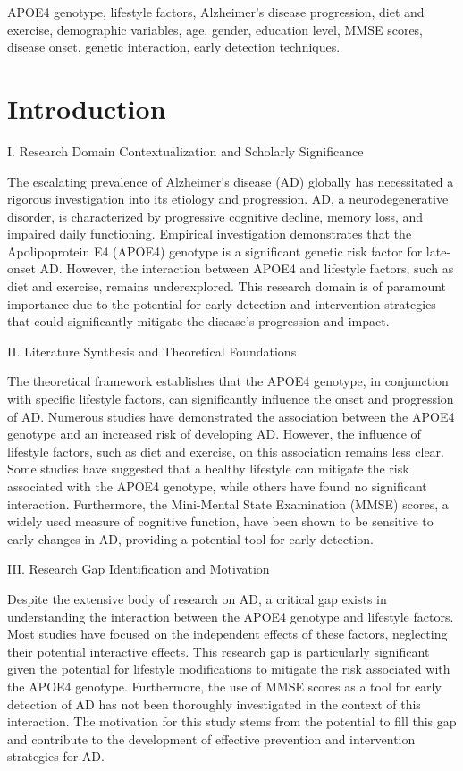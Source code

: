 \documentclass[conference]{IEEEtran}
\begin{document}
\begin{IEEEkeywords}
APOE4 genotype, lifestyle factors, Alzheimer's disease progression, diet and exercise, demographic variables, age, gender, education level, MMSE scores, disease onset, genetic interaction, early detection techniques.
\end{IEEEkeywords}

\section{Introduction}
I. Research Domain Contextualization and Scholarly Significance

The escalating prevalence of Alzheimer's disease (AD) globally has necessitated a rigorous investigation into its etiology and progression. AD, a neurodegenerative disorder, is characterized by progressive cognitive decline, memory loss, and impaired daily functioning. Empirical investigation demonstrates that the Apolipoprotein E4 (APOE4) genotype is a significant genetic risk factor for late-onset AD. However, the interaction between APOE4 and lifestyle factors, such as diet and exercise, remains underexplored. This research domain is of paramount importance due to the potential for early detection and intervention strategies that could significantly mitigate the disease's progression and impact.

II. Literature Synthesis and Theoretical Foundations

The theoretical framework establishes that the APOE4 genotype, in conjunction with specific lifestyle factors, can significantly influence the onset and progression of AD. Numerous studies have demonstrated the association between the APOE4 genotype and an increased risk of developing AD. However, the influence of lifestyle factors, such as diet and exercise, on this association remains less clear. Some studies have suggested that a healthy lifestyle can mitigate the risk associated with the APOE4 genotype, while others have found no significant interaction. Furthermore, the Mini-Mental State Examination (MMSE) scores, a widely used measure of cognitive function, have been shown to be sensitive to early changes in AD, providing a potential tool for early detection.

III. Research Gap Identification and Motivation

Despite the extensive body of research on AD, a critical gap exists in understanding the interaction between the APOE4 genotype and lifestyle factors. Most studies have focused on the independent effects of these factors, neglecting their potential interactive effects. This research gap is particularly significant given the potential for lifestyle modifications to mitigate the risk associated with the APOE4 genotype. Furthermore, the use of MMSE scores as a tool for early detection of AD has not been thoroughly investigated in the context of this interaction. The motivation for this study stems from the potential to fill this gap and contribute to the development of effective prevention and intervention strategies for AD.
\end{document}
